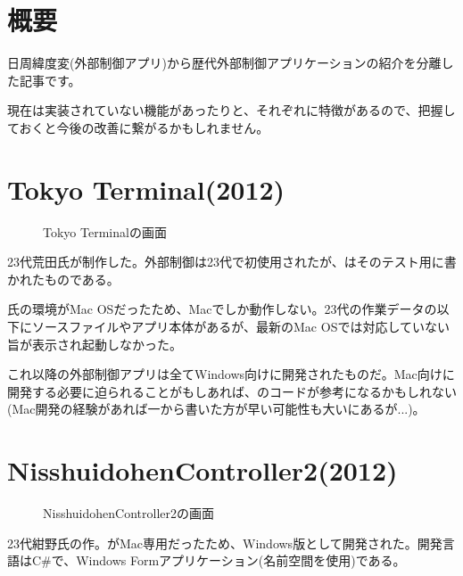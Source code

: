 \documentclass[letterpaper,10pt,dvipdfmx]{sphinxmanual}
\begin{document}
\section{概要}
\label{\detokenize{nissyu-idohen/pc-software-history:id2}}
日周緯度変(外部制御アプリ)から歴代外部制御アプリケーションの紹介を分離した記事です。

現在は実装されていない機能があったりと、それぞれに特徴があるので、把握しておくと今後の改善に繋がるかもしれません。


\section{Tokyo Terminal(2012)}
\label{\detokenize{nissyu-idohen/pc-software-history:tokyo-terminal-2012}}\begin{figure}[htbp]
\centering
\capstart

\noindent{}
\caption{Tokyo Terminalの画面}\label{\detokenize{nissyu-idohen/pc-software-history:id3}}\end{figure}

23代荒田氏が制作した。外部制御は23代で初使用されたが、はそのテスト用に書かれたものである。

氏の環境がMac
OSだったため、Macでしか動作しない。23代の作業データの以下にソースファイルやアプリ本体があるが、最新のMac
OSでは対応していない旨が表示され起動しなかった。

これ以降の外部制御アプリは全てWindows向けに開発されたものだ。Mac向けに開発する必要に迫られることがもしあれば、のコードが参考になるかもしれない(Mac開発の経験があれば一から書いた方が早い可能性も大いにあるが...)。


\section{NisshuidohenController2(2012)}
\label{\detokenize{nissyu-idohen/pc-software-history:nisshuidohencontroller2-2012}}\begin{figure}[htbp]
\centering
\capstart

\noindent{}
\caption{NisshuidohenController2の画面}\label{\detokenize{nissyu-idohen/pc-software-history:id4}}\end{figure}

23代紺野氏の作。がMac専用だったため、Windows版として開発された。開発言語はC\#で、Windows
Formアプリケーション(名前空間を使用)である。
\end{document}

